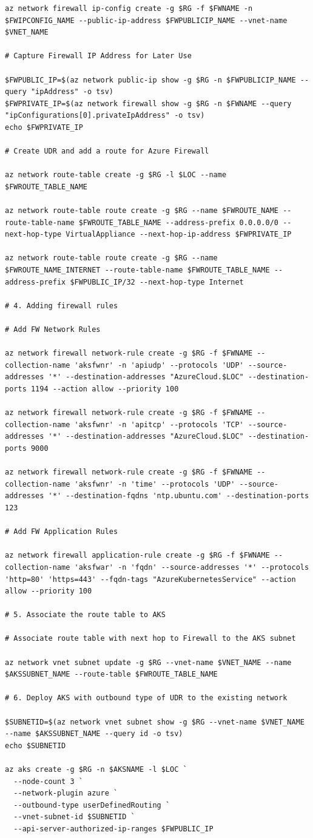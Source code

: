 \documentclass[
]{article}
\begin{document}
\begin{lstlisting}
az network firewall ip-config create -g $RG -f $FWNAME -n $FWIPCONFIG_NAME --public-ip-address $FWPUBLICIP_NAME --vnet-name $VNET_NAME

# Capture Firewall IP Address for Later Use

$FWPUBLIC_IP=$(az network public-ip show -g $RG -n $FWPUBLICIP_NAME --query "ipAddress" -o tsv)
$FWPRIVATE_IP=$(az network firewall show -g $RG -n $FWNAME --query "ipConfigurations[0].privateIpAddress" -o tsv)
echo $FWPRIVATE_IP

# Create UDR and add a route for Azure Firewall

az network route-table create -g $RG -l $LOC --name $FWROUTE_TABLE_NAME

az network route-table route create -g $RG --name $FWROUTE_NAME --route-table-name $FWROUTE_TABLE_NAME --address-prefix 0.0.0.0/0 --next-hop-type VirtualAppliance --next-hop-ip-address $FWPRIVATE_IP

az network route-table route create -g $RG --name $FWROUTE_NAME_INTERNET --route-table-name $FWROUTE_TABLE_NAME --address-prefix $FWPUBLIC_IP/32 --next-hop-type Internet

# 4. Adding firewall rules

# Add FW Network Rules

az network firewall network-rule create -g $RG -f $FWNAME --collection-name 'aksfwnr' -n 'apiudp' --protocols 'UDP' --source-addresses '*' --destination-addresses "AzureCloud.$LOC" --destination-ports 1194 --action allow --priority 100

az network firewall network-rule create -g $RG -f $FWNAME --collection-name 'aksfwnr' -n 'apitcp' --protocols 'TCP' --source-addresses '*' --destination-addresses "AzureCloud.$LOC" --destination-ports 9000

az network firewall network-rule create -g $RG -f $FWNAME --collection-name 'aksfwnr' -n 'time' --protocols 'UDP' --source-addresses '*' --destination-fqdns 'ntp.ubuntu.com' --destination-ports 123

# Add FW Application Rules

az network firewall application-rule create -g $RG -f $FWNAME --collection-name 'aksfwar' -n 'fqdn' --source-addresses '*' --protocols 'http=80' 'https=443' --fqdn-tags "AzureKubernetesService" --action allow --priority 100

# 5. Associate the route table to AKS

# Associate route table with next hop to Firewall to the AKS subnet

az network vnet subnet update -g $RG --vnet-name $VNET_NAME --name $AKSSUBNET_NAME --route-table $FWROUTE_TABLE_NAME

# 6. Deploy AKS with outbound type of UDR to the existing network

$SUBNETID=$(az network vnet subnet show -g $RG --vnet-name $VNET_NAME --name $AKSSUBNET_NAME --query id -o tsv)
echo $SUBNETID

az aks create -g $RG -n $AKSNAME -l $LOC `
  --node-count 3 `
  --network-plugin azure `
  --outbound-type userDefinedRouting `
  --vnet-subnet-id $SUBNETID `
  --api-server-authorized-ip-ranges $FWPUBLIC_IP
\end{lstlisting}
\end{document}

